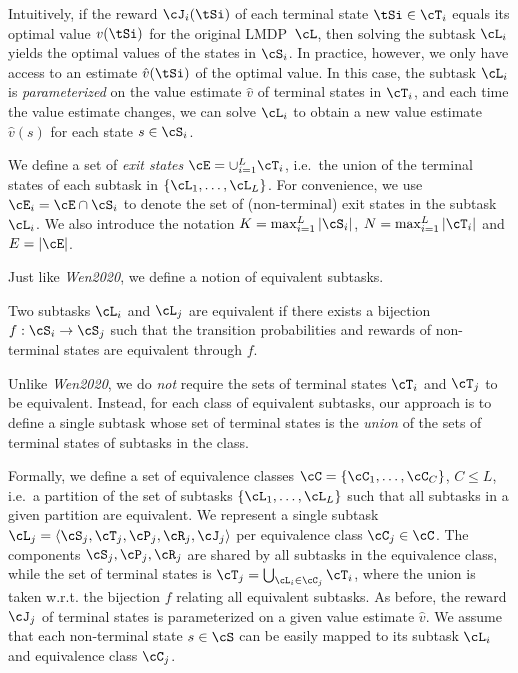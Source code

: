 Intuitively, if the reward $\cJ_i(\tSi)$ of each terminal state $\tSi\in\cT_i$ equals its optimal value $v(\tSi)$ for the original LMDP~$\cL$, then solving the subtask $\cL_i$ yields the optimal values of the states in $\cS_i$.
In practice, however, we only have access to an estimate $\hat{v}(\tSi)$ of the optimal value.
In this case, the subtask $\cL_i$ is {\em parameterized} on the value estimate $\hat{v}$ of terminal states in $\cT_i$, and each time the value estimate changes, we can solve $\cL_i$ to obtain a new value estimate
$\hat{v}(s)$ for each state $s\in\cS_i$.



We define a set of {\em exit states} $\cE=\cup_{i=1}^L\cT_i$, i.e.~the union of the terminal states of each subtask in $\{\cL_1,\ldots,\cL_L\}$. For convenience, we use $\cE_i=\cE\cap\cS_i$ to denote the set of (non-terminal) exit states in the subtask $\cL_i$. We also introduce the notation $K=\max_{i=1}^L|\cS_i|$, $N=\max_{i=1}^L|\cT_i|$ and $E=|\cE|$.

Just like \textit{Wen2020}, we define a notion of equivalent subtasks.
\begin{definition}
Two subtasks $\cL_i$ and $\cL_j$ are equivalent if there exists a bijection $f:\cS_i\rightarrow\cS_j$ such that the transition probabilities and rewards of non-terminal states are equivalent through $f$.
\end{definition}
Unlike \textit{Wen2020}, we do {\em not} require the sets of terminal states $\cT_i$ and $\cT_j$ to be equivalent. Instead, for each class of equivalent subtasks, our approach is to define a single subtask whose set of terminal states is the {\em union} of the sets of terminal states of subtasks in the class.

Formally, we define a set of equivalence classes $\cC=\{\cC_1,\ldots,\cC_C\}$, $C\leq L$, i.e.~a partition of the set of subtasks $\{\cL_1,\ldots,\cL_L\}$ such that all subtasks in a given partition are equivalent. We represent a single subtask $\cL_j=\langle\cS_j,\cT_j,\cP_j,\cR_j,\cJ_j\rangle$ per equivalence class $\cC_j\in\cC$. The components $\cS_j,\cP_j,\cR_j$ are shared by all subtasks in the equivalence class, while the set of terminal states is $\cT_j=\bigcup_{\cL_i\in\cC_j} \cT_i$, where the union is taken w.r.t. the bijection $f$ relating all equivalent subtasks. As before, the reward $\cJ_j$ of terminal states is parameterized on a given value estimate $\hat{v}$. We assume that each non-terminal state $s\in\cS$ can be easily mapped to its subtask $\cL_i$ and equivalence class $\cC_j$.


